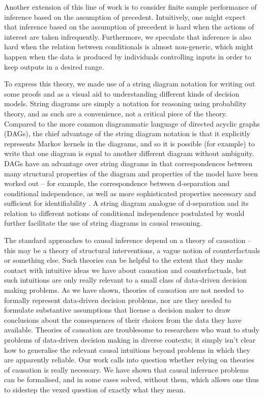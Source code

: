 Another extension of this line of work is to consider finite sample performance of inference based on the assumption of precedent. Intuitively, one might expect that inference based on the assumption of precedent is hard when the actions of interest are taken infrequently. Furthermore, we speculate that inference is also hard when the relation between conditionals is almost non-generic, which might happen when the data is produced by individuals controlling inputs in order to keep outputs in a desired range.

To express this theory, we made use of a string diagram notation for writing out some proofs and as a visual aid to understanding different kinds of decision models. String diagrams are simply a notation for reasoning using probability theory, and as such are a convenience, not a critical piece of the theory. Compared to the more common diagrammatic language of directed acyclic graphs (DAGs), the chief advantage of the string diagram notation is that it explicitly represents Markov kernels in the diagrams, and so it is possible (for example) to write that one diagram is equal to another different diagram without ambiguity. DAGs have an advantage over string diagrams in that correspondences between many structural properties of the diagram and properties of the model have been worked out -- for example, the correspondence between d-separation and conditional independence, as well as more sophisticated properties necessary and sufficient for identifiability \citep{tian2002general,shpitser_complete_2008}. A string diagram analogue of d-separation and its relation to different notions of conditional independence postulated by \citet{fritz_synthetic_2020} would further facilitate the use of string diagrams in causal reasoning.

The standard approaches to causal inference depend on a theory of causation -- this may be a theory of structural interventions, a vague notion of counterfactuals or something else. Such theories can be helpful to the extent that they make contact with intuitive ideas we have about causation and counterfactuals, but such intuitions are only really relevant to a small class of data-driven decision making problems. As we have shown, theories of causation are not needed to formally represent data-driven decision problems, nor are they needed to formulate substantive assumptions that license a decision maker to draw conclusions about the consequences of their choices from the data they have available. Theories of causation are troublesome to researchers who want to study problems of data-driven decision making in diverse contexts; it simply isn't clear how to generalise the relevant causal intuitions beyond problems in which they are apparently reliable. Our work calls into question whether relying on theories of causation is really necessary. We have shown that causal inference problems can be formalised, and in some cases solved,  without them, which allows one thus to sidestep the vexed question of exactly what they mean.